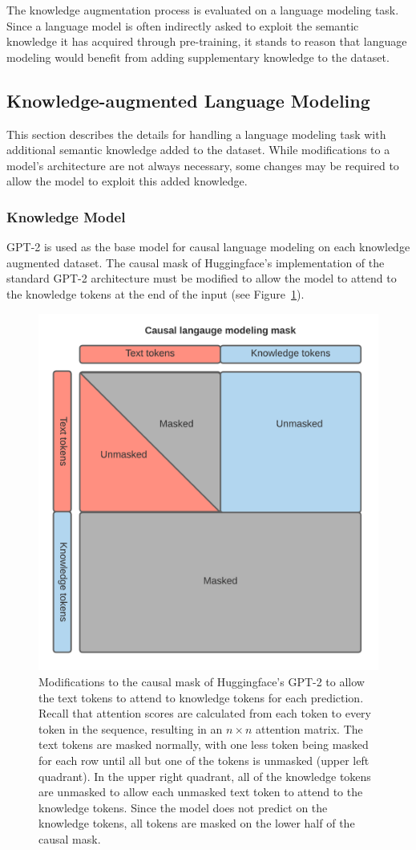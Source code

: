 \documentclass[phd,electronic,oneside,twosidetoc,letterpaper,chaptercenter,parttop,lof]{byumsphd}
\begin{document}
The knowledge augmentation process is evaluated on a language modeling task.
Since a language model is often indirectly asked to exploit the semantic knowledge it has acquired through pre-training, it stands to reason that language modeling would benefit from adding supplementary knowledge to the dataset.

\subsection{Knowledge-augmented Language Modeling}

This section describes the details for handling a language modeling task with additional semantic knowledge added to the dataset.
While modifications to a model's architecture are not always necessary, some changes may be required to allow the model to exploit this added knowledge.

\subsubsection{Knowledge Model}

GPT-2 is used as the base model for causal language modeling on each knowledge augmented dataset. 
The causal mask of Huggingface's \cite{wolf2019huggingface} implementation of the standard GPT-2 architecture must be modified to allow the model to attend to the knowledge tokens at the end of the input (see Figure~\ref{fig:knowledge_model}).
        
\begin{figure}
    \centering
    \includegraphics[width=0.5\linewidth]{images/ssm/knowledge_model_causal_mask.png}
    \caption[Knowledge model causal mask]{
        Modifications to the causal mask of Huggingface's GPT-2 to allow the text tokens to attend to knowledge tokens for each prediction.
        Recall that attention scores are calculated from each token to every token in the sequence, resulting in an $n \times n$ attention matrix.
        The text tokens are masked normally, with one less token being masked for each row until all but one of the tokens is unmasked (upper left quadrant).
        In the upper right quadrant, all of the knowledge tokens are unmasked to allow each unmasked text token to attend to the knowledge tokens.
        Since the model does not predict on the knowledge tokens, all tokens are masked on the lower half of the causal mask.
    }
    \label{fig:knowledge_model}
\end{figure}
        
\end{document}
